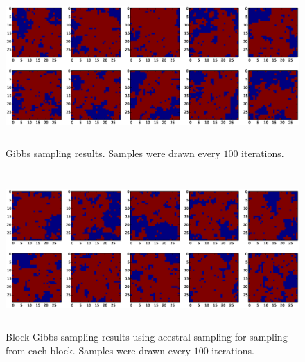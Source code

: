 \documentclass[a4paper]{article}
\begin{document}
\begin{figure}
    \begin{center}
        \includegraphics[width=15cm,height=6cm]{samples.eps}
        \caption{Gibbs sampling results. Samples were drawn every $100$ iterations.}
        \label{fig:gibbs}
    \end{center}
\end{figure}

\begin{figure}
    \begin{center}
        \includegraphics[width=15cm,height=6cm]{sample_block.eps}
        \caption{Block Gibbs sampling results using acestral sampling for sampling from each block. 
        Samples were drawn every $100$ iterations.}
        \label{fig:block_gibbs}
    \end{center}
\end{figure}
\end{document}
